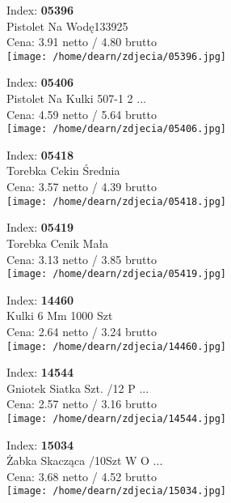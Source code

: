 {Index: \textbf{05396}\\
Pistolet Na Wodę133925\\
Cena: 3.91 netto / 4.80 brutto\\
  \texttt{[image: /home/dearn/zdjecia/05396.jpg]}}\newline\newline

{Index: \textbf{05406}\\
Pistolet Na Kulki 507-1 2 ...\\
Cena: 4.59 netto / 5.64 brutto\\
  \texttt{[image: /home/dearn/zdjecia/05406.jpg]}}\newline\newline

{Index: \textbf{05418}\\
Torebka Cekin Średnia\\
Cena: 3.57 netto / 4.39 brutto\\
  \texttt{[image: /home/dearn/zdjecia/05418.jpg]}}\newline\newline

{Index: \textbf{05419}\\
Torebka Cenik Mała\\
Cena: 3.13 netto / 3.85 brutto\\
  \texttt{[image: /home/dearn/zdjecia/05419.jpg]}}\newline\newline

{Index: \textbf{14460}\\
Kulki 6 Mm 1000 Szt\\
Cena: 2.64 netto / 3.24 brutto\\
  \texttt{[image: /home/dearn/zdjecia/14460.jpg]}}\newline\newline

{Index: \textbf{14544}\\
Gniotek Siatka Szt. /12 P ...\\
Cena: 2.57 netto / 3.16 brutto\\
  \texttt{[image: /home/dearn/zdjecia/14544.jpg]}}\newline\newline

{Index: \textbf{15034}\\
Żabka Skacząca /10Szt W O ...\\
Cena: 3.68 netto / 4.52 brutto\\
  \texttt{[image: /home/dearn/zdjecia/15034.jpg]}}\newline\newline

